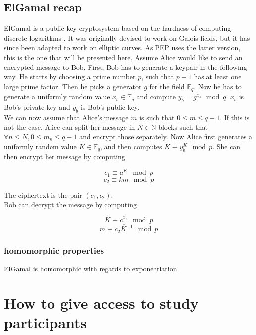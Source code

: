 \documentclass{report}
\begin{document}
\subsection{ElGamal recap}
ElGamal is a public key cryptosystem based on the hardness of computing discrete logarithms \cite{elgamal}. It was originally devised to work on Galois fields, but it has since
been adapted to work on elliptic curves. As PEP uses the latter version, this is the one that will be presented here. Assume Alice would like to send an encrypted message to Bob. First, Bob has to
generate a keypair in the following way. He starts by choosing a prime number $p$, such that $p-1$ has at least one large prime factor. Then he picks a generator $g$ for
the field $\mathds{F}_q$. Now he has to generate a uniformly random value $x_b \in \mathds{F}_q$ and compute $y_b=g^{x_b} \mod q$. $x_b$ is Bob's private key and $y_b$ is Bob's
public key.\\
We can now assume that Alice's message $m$ is such that $0 \leq m \leq q-1$. If this is not the case, Alice can split her message in $N \in \mathds{N}$ blocks such that $\forall n
\leq N, 0 \leq m_n \leq q-1 $ and encrypt those separately. Now Alice first generates a uniformly random value $K \in \mathds{F}_q$, and then computes $K \equiv y_b^K \mod p$. She can
then encrypt her message by computing 

$$c_1 \equiv a^K \mod p$$
$$c_2 \equiv km \mod p$$

The ciphertext is the pair $(c_1, c_2)$. \\

Bob can decrypt the message by computing

$$K \equiv c_1^{x_b} \mod p$$
$$m \equiv c_2K^{-1} \mod p$$

\subsubsection{homomorphic properties}
ElGamal is homomorphic with regards to exponentiation. 

\section{How to give access to study participants}
\end{document}
